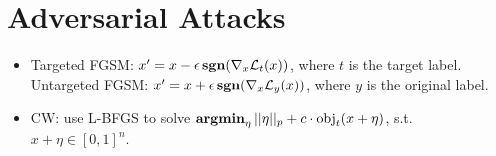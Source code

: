 \section{Adversarial Attacks}

\begin{itemize}
    \item Targeted FGSM: $x^\prime = x - \epsilon \operatorname{\textbf{sgn}}(\nabla_x \mathcal{L}_t(x))$, where $t$ is the target label. Untargeted FGSM: $x^\prime = x + \epsilon \operatorname{\textbf{sgn}}(\nabla_x \mathcal{L}_y (x))$, where $y$ is the original label.
    \item CW: use L-BFGS to solve $\operatorname{\textbf{argmin}}_\eta ||\eta||_p+c\cdot \text{obj}_t(x+\eta)$, s.t. $x+\eta\in [0,1]^n$.
\end{itemize}